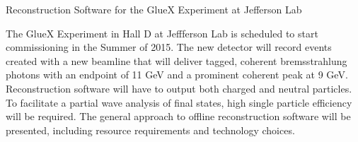 Reconstruction Software for the GlueX Experiment at Jefferson Lab

The GlueX Experiment in Hall D at Jeffferson Lab is scheduled to start
commissioning in the Summer of 2015. The new detector will record
events created with a new beamline that will deliver tagged, coherent
bremsstrahlung photons with an endpoint of 11 GeV and a prominent
coherent peak at 9 GeV. Reconstruction software will have to output
both charged and neutral particles. To facilitate a partial wave
analysis of final states, high single particle efficiency will be
required. The general approach to offline reconstruction software will
be presented, including resource requirements and technology choices.
